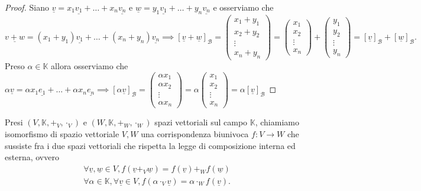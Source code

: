 \begin{proof}
    Siano $\underline{v} = x_1 \underline{v_1} + \ldots + x_n \underline{v_n}$ e $\underline{w} = y_1 \underline{v_1} + \ldots + y_n \underline{v_n}$ e osserviamo che
    $$
        \underline{v + w} = (x_1 + y_1) \underline{v_1} + \ldots + (x_n + y_n) \underline{v_n} \implies [\underline{v} + \underline{w}]_\mathcal{B} = \begin{pmatrix}
            x_1 + y_1 \\
            x_2 + y_2 \\
            \vdots \\
            x_n + y_n
        \end{pmatrix} = \begin{pmatrix}
            x_1 \\
            x_2 \\
            \vdots \\
            x_n
        \end{pmatrix} + \begin{pmatrix}
            y_1 \\
            y_2 \\
            \vdots \\
            y_n
        \end{pmatrix} = [\underline{v}]_\mathcal{B} + [\underline{w}]_\mathcal{B}.
    $$
    Preso $\alpha \in \mathbb{K}$ allora osserviamo che $\alpha \underline{v} = \alpha x_1 \underline{e_1} + \ldots + \alpha x_n \underline{e_n} \implies [\alpha \underline{v}]_\mathcal{B} = \begin{pmatrix}
        \alpha x_1 \\
        \alpha x_2 \\
        \vdots \\
        \alpha x_n
    \end{pmatrix} = \alpha \begin{pmatrix} x_1 \\ x_2 \\ \vdots \\ x_n \end{pmatrix} = \alpha [\underline{v}]_\mathcal{B}$
\end{proof}
\begin{definition}
    Presi $(V, \mathbb{K}, +_V, \cdot_V)$ e $(W, \mathbb{K}, +_W, \cdot_W)$ spazi vettoriali sul campo $\mathbb{K}$, chiamiamo isomorfismo di spazio vettoriale $V, W$ una corrispondenza biunivoca $f: V \to W$ che sussiste fra i due spazi vettoriali che rispetta la legge di composizione interna ed esterna, ovvero
    \begin{align}
        &\forall \underline{v}, \underline{w} \in V, f(\underline{v} +_V \underline{w}) = f(\underline{v}) +_W f(\underline{w}) \\
        &\forall \alpha \in \mathbb{K}, \forall \underline{v} \in V, f(\alpha \cdot_V \underline{v}) = \alpha \cdot_W f(\underline{v}).
    \end{align}
\end{definition}
